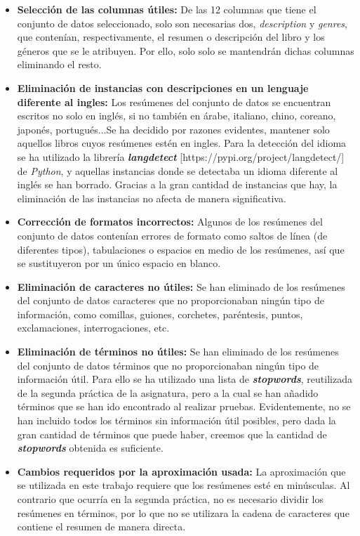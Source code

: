 \documentclass[12pt,a4paper, xcolor=table]{article}
\begin{document}
        \begin{itemize}
            \item \textbf{Selección de las columnas útiles:} De las 12 columnas que tiene el conjunto de datos seleccionado, solo son necesarias dos, \textit{description} y \textit{genres}, que contenían, respectivamente, el resumen o descripción del libro y los géneros que se le atribuyen. Por ello, solo solo se mantendrán dichas columnas eliminando el resto.
            \item \textbf{Eliminación de instancias con descripciones en un lenguaje diferente al ingles:} Los resúmenes del conjunto de datos se encuentran escritos no solo en inglés, si no también en árabe, italiano, chino, coreano, japonés, portugués...Se ha decidido por razones evidentes, mantener solo aquellos libros cuyos resúmenes estén en ingles. Para la detección del idioma se ha utilizado la librería \textit{\textbf{langdetect}} [https://pypi.org/project/langdetect/] de \textit{Python}, y aquellas instancias donde se detectaba un idioma diferente al inglés se han borrado. Gracias a la gran cantidad de instancias que hay, la eliminación de las instancias no afecta de manera significativa.
            \item \textbf{Corrección de formatos incorrectos:} Algunos de los resúmenes del conjunto de datos contenían errores de formato como saltos de línea (de diferentes tipos), tabulaciones o espacios en medio de los resúmenes, así que se sustituyeron por un único espacio en blanco.
            \item \textbf{Eliminación de caracteres no útiles:} Se han eliminado de los resúmenes del conjunto de datos caracteres que no proporcionaban ningún tipo de información, como comillas, guiones, corchetes, paréntesis, puntos, exclamaciones, interrogaciones, etc.
            \item \textbf{Eliminación de términos no útiles:} Se han eliminado de los resúmenes del conjunto de datos términos que no proporcionaban ningún tipo de información útil. Para ello se ha utilizado una lista de \textit{\textbf{stopwords}}, reutilizada de la segunda práctica de la asignatura, pero a la cual se han añadido términos que se han ido encontrado al realizar pruebas. Evidentemente, no se han incluido todos los términos sin información útil posibles, pero dada la gran cantidad de términos que puede haber, creemos que la cantidad de \textit{\textbf{stopwords}} obtenida es suficiente.
            \item \textbf{Cambios requeridos por la aproximación usada:} La aproximación que se utilizada en este trabajo requiere que los resúmenes esté en minúsculas. Al contrario que ocurría en la segunda práctica, no es necesario dividir los resúmenes en términos, por lo que no se utilizara la cadena de caracteres que contiene el resumen de manera directa.

\end{itemize}
\end{document}
